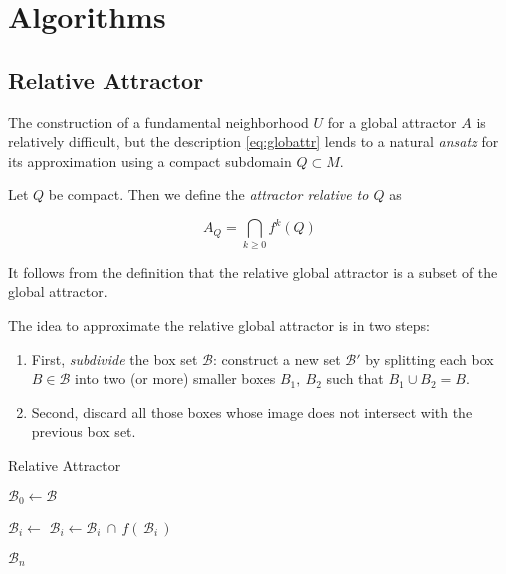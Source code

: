 \section{Algorithms}


\subsection{Relative Attractor}

The construction of a fundamental neighborhood $U$ for a global attractor $A$ is
relatively difficult, but the description \autoref{eq:globattr} lends to 
a natural \emph{ansatz} for its approximation using a compact subdomain $Q \subset M$. \\

\begin{definition}
    Let $Q$ be compact. Then we define the \emph{attractor relative to $Q$} as

    \begin{equation}
        A_Q = \bigcap\limits_{k \geq 0} f^k (Q)
    \end{equation}

\end{definition}

\begin{remark}
    It follows from the definition that the relative global attractor is a subset of the 
    global attractor.\\
\end{remark}

The idea to approximate the relative global attractor is in two steps:

\begin{enumerate}
    \item First, \emph{subdivide} the box set $\mathcal{B}$: construct a new set 
    $\mathcal{B}'$ by splitting each box $B \in \mathcal{B}$ into two (or more) 
    smaller boxes $B_1,\ B_2$ such that $B_1 \cup B_2 = B$. 
    \item Second, discard all those boxes whose image does not intersect with the 
    previous box set. 
\end{enumerate}

\begin{algorithm}
    \caption{Relative Attractor}
    \label{alg:relativeattractor}

    \begin{algorithmic}[1]
        \State $\mathcal{B}_0 \gets \mathcal{B}$

            \State $\mathcal{B}_i \gets$ 
            \State $\mathcal{B}_i \gets \mathcal{B}_i\, \cap\, f (\,\mathcal{B}_i\,)$
        \EndFor

        \State \Return $\mathcal{B}_n$ 
    \end{algorithmic}
\end{algorithm}

